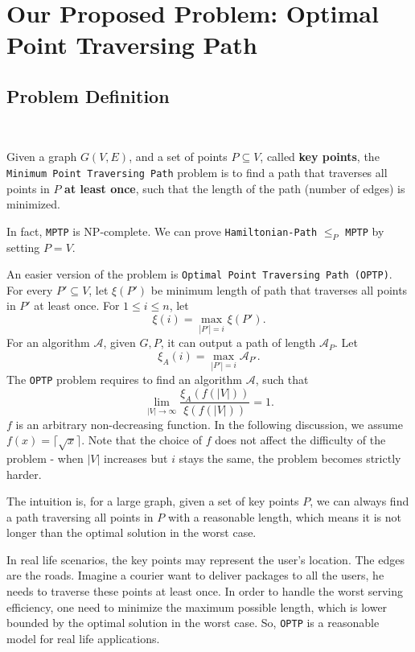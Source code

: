 \documentclass[11pt]{article}
\theoremstyle{plain}
\begin{document}
\section{Our Proposed Problem: Optimal Point Traversing Path}

\subsection{Problem Definition}\

Given a graph $G(V,E)$, and a set of points $P\subseteq V$, called \textbf{key points}, the \texttt{Minimum Point Traversing Path} problem is to find a path that traverses all points in $P$ \textbf{at least once}, such that the length of the path (number of edges) is minimized. 

In fact, \texttt{MPTP} is NP-complete. We can prove \texttt{Hamiltonian-Path} $\le_P$ \texttt{MPTP} by setting $P=V$.

An easier version of the problem is \texttt{Optimal Point Traversing Path (OPTP)}. For every $P'\subseteq V$, let $\xi(P')$ be minimum length of path that traverses all points in $P'$ at least once. For $1\le i\le n$, let
$$\xi(i) = \max\limits_{|P'|=i} \xi(P').$$
For an algorithm $\mathcal{A}$, given $G,P$, it can output a path of length $\mathcal{A}_P$. Let
$$\xi_A(i) = \max\limits_{|P'|=i} \mathcal{A}_{P'}.$$
The \texttt{OPTP} problem requires to find an algorithm $\mathcal{A}$, such that
$$\lim\limits_{|V|\to \infty} \dfrac{\xi_A(f(|V|))}{\xi(f(|V|))}=1.$$
$f$ is an arbitrary non-decreasing function. In the following discussion, we assume $f(x)=\lceil\sqrt{x}\rceil$. Note that the choice of $f$ does not affect the difficulty of the problem - when $|V|$ increases but $i$ stays the same, the problem becomes strictly harder.

The intuition is, for a large graph, given a set of key points $P$, we can always find a path traversing all points in $P$ with a reasonable length, which means it is not longer than the optimal solution in the worst case. 

In real life scenarios, the key points may represent the user's location. The edges are the roads. Imagine a courier want to deliver packages to all the users, he needs to traverse these points at least once. In order to handle the worst serving efficiency, one need to minimize the maximum possible length, which is lower bounded by the optimal solution in the worst case. So, \texttt{OPTP} is a reasonable model for real life applications.
\end{document}
